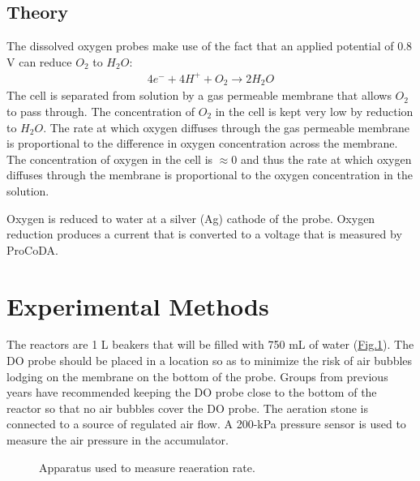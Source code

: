\documentclass[letterpaper,10pt,english]{sphinxmanual}
\let\sphinxpxdimen\pdfpxdimen\else\newdimen\sphinxpxdimen
\begin{document}
\subsection{Theory}
\label{\detokenize{Gas_Transfer/Gas_Transfer:id1}}
The dissolved oxygen probes make use of the fact that an applied potential of 0.8 V can reduce \(O_2\) to \(H_2O\):
\begin{equation}\label{equation:Gas_Transfer/Gas_Transfer:Gas_Transfer/Gas_Transfer:7}
\begin{split}4 e^- + 4 H^+ + O_2 \mathrm{\to} 2 H_2O\end{split}
\end{equation}
The cell is separated from solution by a gas permeable membrane that allows \(O_2\) to pass through. The concentration of \(O_2\) in the cell is kept very low by reduction to \(H_2O\). The rate at which oxygen diffuses through the gas permeable membrane is proportional to the difference in oxygen concentration across the membrane. The concentration of oxygen in the cell is \(\mathrm{\approx}0\) and thus the rate at which oxygen diffuses through the membrane is proportional to the oxygen concentration in the solution.

Oxygen is reduced to water at a silver (Ag) cathode of the probe. Oxygen reduction produces a current that is converted to a voltage that is measured by ProCoDA.


\section{Experimental Methods}
\label{\detokenize{Gas_Transfer/Gas_Transfer:experimental-methods}}\label{\detokenize{Gas_Transfer/Gas_Transfer:heading-gas-transfer-experimental-methods}}
The reactors are 1 L beakers that will be filled with 750 mL of water (\hyperref[\detokenize{Gas_Transfer/Gas_Transfer:figure-gas-schematic}]{Fig.\@ \ref{\detokenize{Gas_Transfer/Gas_Transfer:figure-gas-schematic}}}). The DO probe should be placed in a location so as to minimize the risk of air bubbles lodging on the membrane on the bottom of the probe. Groups from previous years have recommended keeping the DO probe close to the bottom of the reactor so that no air bubbles cover the DO probe. The aeration stone is connected to a source of regulated air flow. A 200-kPa pressure sensor is used to measure the air pressure in the accumulator.

\begin{figure}[htbp]
\centering
\capstart

\noindent\sphinxincludegraphics[width=600\sphinxpxdimen]{{new_schematic}.png}
\caption{Apparatus used to measure reaeration rate.}\label{\detokenize{Gas_Transfer/Gas_Transfer:id5}}\label{\detokenize{Gas_Transfer/Gas_Transfer:figure-gas-schematic}}\end{figure}
\end{document}
